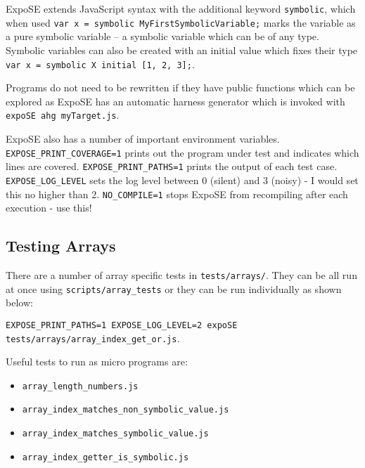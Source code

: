 \documentclass[]{final_report}
\begin{document}
ExpoSE extends JavaScript syntax with the additional keyword \lstinline|symbolic|, which when used \lstinline|var x = symbolic MyFirstSymbolicVariable;| marks the variable as a pure symbolic variable -- a symbolic variable which can be of any type. Symbolic variables can also be created with an initial value which fixes their type \lstinline|var x = symbolic X initial [1, 2, 3];|.

Programs do not need to be rewritten if they have public functions which can be explored as ExpoSE has an automatic harness generator which is invoked with \lstinline|expoSE ahg myTarget.js|.

ExpoSE also has a number of important environment variables. \lstinline|EXPOSE_PRINT_COVERAGE=1| prints out the program under test and indicates which lines are covered. \lstinline|EXPOSE_PRINT_PATHS=1| prints the output of each test case. \lstinline|EXPOSE_LOG_LEVEL| sets the log level between 0 (silent) and 3 (noisy) - I would set this no higher than 2. \lstinline|NO_COMPILE=1| stops ExpoSE from recompiling after each execution - use this!

\subsection{Testing Arrays}
There are a number of array specific tests in \lstinline|tests/arrays/|. They can be all run at once using \lstinline|scripts/array_tests| or they can be run individually as shown below:

\lstinline|EXPOSE_PRINT_PATHS=1 EXPOSE_LOG_LEVEL=2 expoSE tests/arrays/array_index_get_or.js|.

Useful tests to run as micro programs are:
\begin{itemize}
  \item \lstinline|array_length_numbers.js|
  \item \lstinline|array_index_matches_non_symbolic_value.js|
  \item \lstinline|array_index_matches_symbolic_value.js|
  \item \lstinline|array_index_getter_is_symbolic.js|
\end{itemize}
\end{document}
